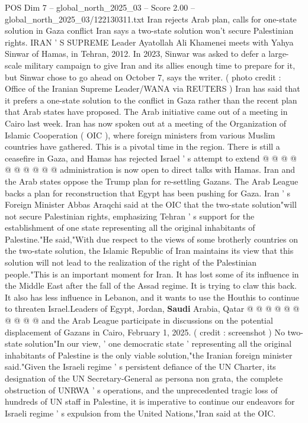 \begin{textsample}{POS Dim 7 – global\_north\_2025\_03 – Score 2.00 – global\_north\_2025\_03/122130311.txt}  \label{ex:f7_pos_324}
Iran rejects Arab plan, calls for one-state solution in Gaza conflict Iran says a two-state solution won't secure Palestinian rights.
IRAN ' S SUPREME Leader Ayatollah Ali Khamenei meets with Yahya Sinwar of Hamas, in Tehran, 2012.
In 2023, Sinwar was asked to defer a large-scale military campaign to give Iran and its allies enough time to prepare for it, but Sinwar chose to go ahead on October 7, says the writer. ( photo credit : Office of the Iranian Supreme Leader/WANA via REUTERS ) Iran has said that it prefers a one-state solution to the conflict in Gaza rather than the recent plan that Arab states have proposed.
The Arab initiative came out of a meeting in Cairo last week.
Iran has now spoken out at a meeting of the Organization of Islamic Cooperation ( OIC ), where foreign ministers from various Muslim countries have gathered.
This is a pivotal time in the region.
There is still a ceasefire in Gaza, and Hamas has rejected Israel ' s attempt to extend @ @ @ @ @ @ @ @ @ @ administration is now open to direct talks with Hamas.
Iran and the Arab states oppose the Trump plan for re-settling Gazans.
The Arab League backs a plan for reconstruction that Egypt has been pushing for Gaza.
Iran ' s Foreign Minister Abbas Araqchi said at the OIC that the two-state solution"will not secure Palestinian rights, emphasizing Tehran ' s support for the establishment of one state representing all the original inhabitants of Palestine."He said,"With due respect to the views of some brotherly countries on the two-state solution, the Islamic Republic of Iran maintains its view that this solution will not lead to the realization of the right of the Palestinian people."This is an important moment for Iran.
It has lost some of its influence in the Middle East after the fall of the Assad regime.
It is trying to claw this back.
It also has less influence in Lebanon, and it wants to use the Houthis to continue to threaten Israel.Leaders of Egypt, Jordan, \textbf{Saudi} Arabia, Qatar @ @ @ @ @ @ @ @ @ @ and the Arab League participate in discussions on the potential displacement of Gazans in Cairo, February 1, 2025. ( credit : screenshot ) No two-state solution"In our view, ' one democratic state ' representing all the original inhabitants of Palestine is the only viable solution,"the Iranian foreign minister said."Given the Israeli regime ' s persistent defiance of the UN Charter, its designation of the UN Secretary-General as persona non grata, the complete obstruction of UNRWA ' s operations, and the unprecedented tragic loss of hundreds of UN staff in Palestine, it is imperative to continue our endeavors for Israeli regime ' s expulsion from the United Nations,"Iran said at the OIC.

\end{textsample}
